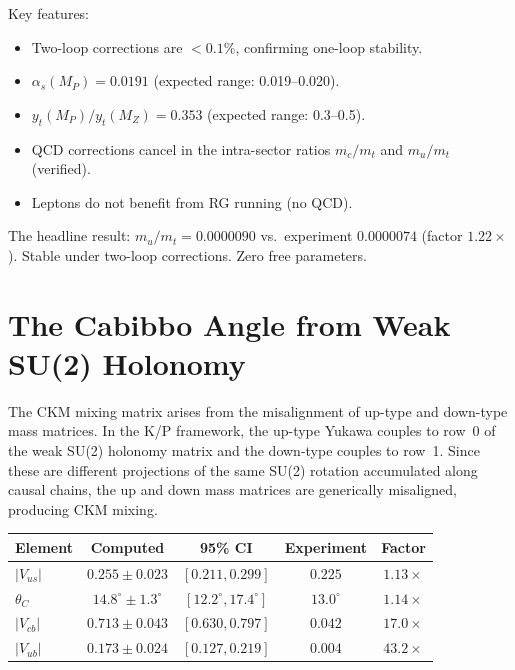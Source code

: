 \documentclass[11pt,letterpaper]{article}
\begin{document}
\noindent Key features:
\begin{itemize}[nosep]
  \item Two-loop corrections are $< 0.1\%$, confirming one-loop stability.
  \item $\alpha_s(M_P) = 0.0191$ (expected range: 0.019--0.020).
  \item $y_t(M_P)/y_t(M_Z) = 0.353$ (expected range: 0.3--0.5).
  \item QCD corrections cancel in the intra-sector ratios $m_c/m_t$
    and $m_u/m_t$ (verified).
  \item Leptons do not benefit from RG running (no QCD).
\end{itemize}

\noindent The headline result: $m_u/m_t = 0.0000090$ vs.\ experiment
$0.0000074$ (factor $1.22\times$). Stable under two-loop corrections.
Zero free parameters.

\section{The Cabibbo Angle from Weak SU(2) Holonomy}

The CKM mixing matrix arises from the misalignment of up-type and
down-type mass matrices. In the K/P framework, the up-type Yukawa
couples to row~0 of the weak SU(2) holonomy matrix and the down-type
couples to row~1. Since these are different projections of the same
SU(2) rotation accumulated along causal chains, the up and down mass
matrices are generically misaligned, producing CKM mixing.

\begin{center}
\begin{tabular}{@{}lcccc@{}}
\toprule
Element & Computed & 95\% CI & Experiment & Factor \\
\midrule
$|V_{us}|$ & $0.255 \pm 0.023$ & $[0.211, 0.299]$ & $0.225$ & $1.13\times$ \\
$\theta_C$ & $14.8^\circ \pm 1.3^\circ$ & $[12.2^\circ, 17.4^\circ]$ & $13.0^\circ$ & $1.14\times$ \\
\midrule
$|V_{cb}|$ & $0.713 \pm 0.043$ & $[0.630, 0.797]$ & $0.042$ & $17.0\times$ \\
$|V_{ub}|$ & $0.173 \pm 0.024$ & $[0.127, 0.219]$ & $0.004$ & $43.2\times$ \\
\bottomrule
\end{tabular}
\end{center}
\end{document}
